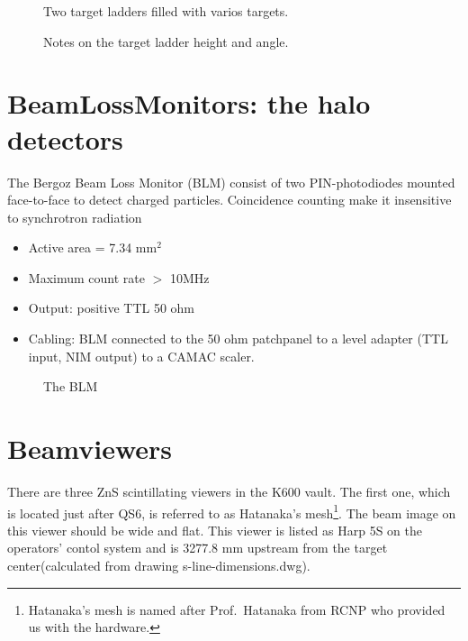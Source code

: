 \documentclass[11pt]{report}
\begin{document}
\begin{figure}[!ht]
\centerline{\vspace{0cm}\hspace{0cm}
}
\centering
\caption{Two target ladders filled with varios targets.}
\label{fig:tgt-ladder-filled}
\end{figure} 

\begin{figure}[!ht]
\centerline{\vspace{0cm}\hspace{0cm}
}
\centering
\caption{Notes on the target ladder height and angle.}
\label{fig:tgtladder-movement}
\end{figure} 

\section{BeamLossMonitors: the halo detectors}

The Bergoz Beam Loss Monitor (BLM) consist of
two PIN-photodiodes mounted face-to-face to detect charged particles.
Coincidence counting make it insensitive to synchrotron radiation 
\begin{itemize} 
\item Active area = 7.34 mm$^2$
\item Maximum count rate $>$ 10MHz 
\item Output: positive TTL 50 ohm
\item Cabling:
BLM connected to the 50 ohm patchpanel to a level adapter (TTL input, NIM output) to a CAMAC scaler.
\end{itemize} 

\begin{figure}[!ht]
\centerline{\vspace{0cm}\hspace{0cm}
}
\centering
\caption{The BLM}
\label{fig:hatanaka}
\end{figure} 


\section{Beamviewers}
There are three ZnS scintillating viewers in the K600 vault. The first one, which is located just after QS6, is referred to as Hatanaka's mesh\footnote{Hatanaka's mesh is named after Prof.~Hatanaka from RCNP who provided us with the hardware.}. The beam image on this viewer should be wide and flat.
This viewer is listed as Harp 5S on the operators' contol system and is 
3277.8 mm upstream from the target center(calculated from drawing s-line-dimensions.dwg).
\end{document}
